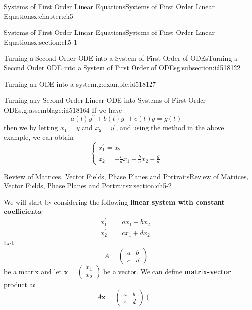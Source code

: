 \documentclass[oneside,10pt,]{book}
\newcommand{\terminology}[1]{\textbf{#1}}
\numberwithin{equation}{section}
\numberwithin{equation}{section}
\newcommand{\amp}{&}
\begin{document}
\begin{chapterptx}{Systems of First Order Linear Equations}{}{Systems of First Order Linear Equations}{}{}{x:chapter:ch5}
\begin{sectionptx}{Systems of First Order Linear Equations}{}{Systems of First Order Linear Equations}{}{}{x:section:ch5-1}
\begin{subsectionptx}{Turning a Second Order ODE into a System of First Order of ODEs}{}{Turning a Second Order ODE into a System of First Order of ODEs}{}{}{g:subsection:id518122}
\begin{example}{Turning an ODE into a system.}{g:example:id518127}
\end{example}
\begin{assemblage}{Turning any Second Order Linear ODE into Systems of First Order ODEs.}{g:assemblage:id518164}%
If we have%
\begin{equation*}
a(t)y^{\prime\prime}+b(t)y^{\prime}+c(t)y=g(t)
\end{equation*}
then we by letting \(x_{1}=y\) and \(x_{2}=y^{\prime}\), and using the method in the above example, we can obtain%
\begin{equation*}
\begin{cases}
x_{1}^{\prime}=x_{2}\\
x_{2}^{\prime}=-\frac{c}{a}x_{1}-\frac{b}{a}x_{2}+\frac{g}{a}
\end{cases}
\end{equation*}
%
\end{assemblage}
\end{subsectionptx}
\end{sectionptx}
%
%
\typeout{************************************************}
\typeout{************************************************}
%
\begin{sectionptx}{Review of Matrices, Vector Fields, Phase Planes and Portraits}{}{Review of Matrices, Vector Fields, Phase Planes and Portraits}{}{}{x:section:ch5-2}
\begin{introduction}{}%
We will start by considering the following \terminology{linear system with constant coefficients}:%
\begin{align*}
x_{1}^{\prime} \amp =  ax_{1}+bx_{2}\\
x_{2}^{\prime} \amp =  cx_{1}+dx_{2}.
\end{align*}
Let%
\begin{equation*}
A=\left(\begin{array}{cc}
a \amp b\\
c \amp d
\end{array}\right)
\end{equation*}
be a matrix and let \(\mathbf{x}=\left(\begin{array}{c}
x_{1}\\
x_{2}
\end{array}\right)\) be a vector. We can define \terminology{matrix-vector} product as%
\begin{equation*}
A\mathbf{x}=\left(\begin{array}{cc}
a \amp b\\
c \amp d
\end{array}\right)\left(\begin{array}{c}

\end{array}
\end{equation*}
\end{introduction}
\end{sectionptx}
\end{chapterptx}
\end{document}
